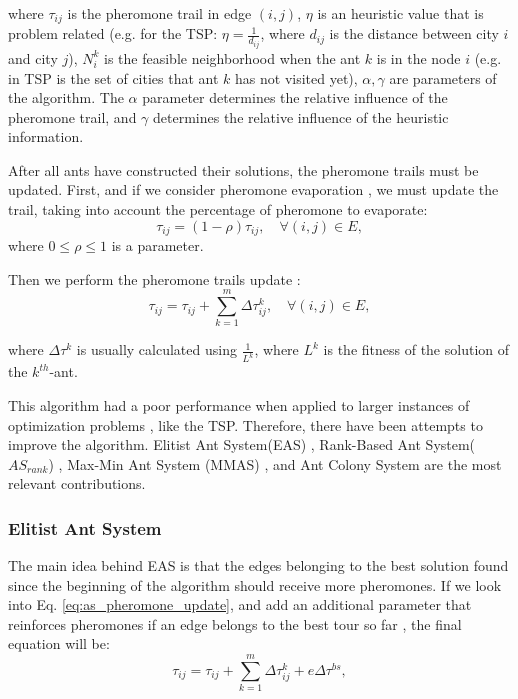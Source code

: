 		\noindent where $\tau_{ij}$ is the pheromone trail in edge $(i,j)$, $\eta$ is an heuristic value that is problem related (e.g. for the TSP: $\eta = \frac{1}{d_{ij}}$, where $d_{ij}$ is the distance between city $i$ and city $j$), $N_i^k$ is the feasible neighborhood when the ant $k$ is in the node $i$ (e.g. in TSP is the set of cities that ant $k$ has not visited yet), $\alpha, \gamma$ are parameters of the algorithm. The $\alpha$ parameter determines the relative influence of the pheromone trail, and $\gamma$ determines the relative influence of the heuristic information.

					After all ants have constructed their solutions, the pheromone trails must be updated. First, and if we consider pheromone evaporation \cite{dorigo96}, we must update the trail, taking into account the percentage of pheromone to evaporate:
					\begin{equation}
						\tau_{ij} = (1 - \rho)\tau_{ij}, \quad \forall(i,j)\in E,
					\end{equation}
		\noindent where $0 \leq \rho \leq 1$ is a parameter.

					Then we perform the  pheromone trails update \cite{dorigo96}:
					\begin{equation}
						\label{eq:as_pheromone_update}
						\tau_{ij} = \tau_{ij} + \sum_{k=1}^{m}\Delta\tau_{ij}^k, \quad \forall(i,j)\in E,
					\end{equation}


		\noindent where $\Delta\tau^k$ is usually calculated using $\frac{1} {L^k}$, where $L^k$ is the fitness of the solution of the $k^{th}$-ant.

					This algorithm had a poor performance when applied to larger instances of optimization problems \cite{acobook}, like the TSP. Therefore, there have been attempts to improve the algorithm. Elitist Ant System(EAS) \cite{dorigo92} \cite{dorigo96}, Rank-Based Ant System($AS_{rank}$) \cite{bullnheimer97}, Max-Min Ant System (MMAS) \cite{stutzle00}, and Ant Colony System \cite{dorigo97} are the most relevant contributions.

					\subsubsection*{Elitist Ant System}

					The main idea behind EAS \cite{dorigo92, dorigo96} is that the edges belonging to the best solution found since the beginning of the algorithm should receive more pheromones. If we look into Eq. \eqref{eq:as_pheromone_update}, and add an additional parameter that reinforces pheromones if an edge belongs to the best tour so far \cite{dorigo92, dorigo96}, the final equation will be:
					\begin{equation}
						\label{eq:eas_pheromone_update}
						\tau_{ij} = \tau_{ij} + \sum_{k=1}^{m}\Delta\tau_{ij}^k + e\Delta\tau^{bs},
					\end{equation}


